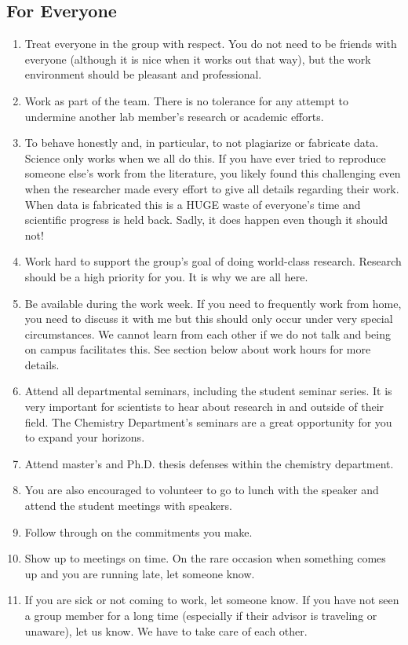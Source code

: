 \documentclass[letterpaper]{article}
\begin{document}
\subsection{For Everyone}
\begin{enumerate}
\item Treat everyone in the group with respect. You do not need to be friends with everyone (although it is nice when it works out that way), but the work environment should be pleasant and professional. 
\item Work as part of the team.  There is  no tolerance for any attempt to undermine another lab member's research or academic efforts.
\item To behave honestly and, in particular, to not plagiarize or fabricate data. Science only works when we all do this. If you have ever tried to reproduce someone else's work from the literature, you likely found this challenging even when the researcher made every effort to give all details regarding their work. When data is fabricated this is a HUGE waste of everyone's time and scientific progress is held back. Sadly, it does happen even though it should not!
\item Work hard to support the group's goal of doing world-class research. Research should be a high priority for you. It is why we are all here. 
\item Be available during the work week. If you need to frequently work from home, you need to discuss it with me but this should only occur under very special circumstances. We cannot learn from each other if we do not talk and being on campus facilitates this. See section below about work hours for more details.
\item Attend all departmental seminars, including the student seminar series. It is very important for scientists to hear about research in and outside of their field. The Chemistry Department's seminars are a great opportunity for you to expand your horizons. 
\item Attend master's and Ph.D. thesis defenses within the chemistry department.
\item You are also encouraged to volunteer to go to lunch with the speaker and attend the student meetings with speakers. 
\item Follow through on the commitments you make.
\item Show up to meetings on time. On the rare occasion when something comes up and you are running late, let someone know.
\item If you are sick or not coming to work, let someone know. If you have not seen a group member for a long time (especially if their advisor is traveling or unaware), let us know. We have to take care of each other.

\end{enumerate}
\end{document}
